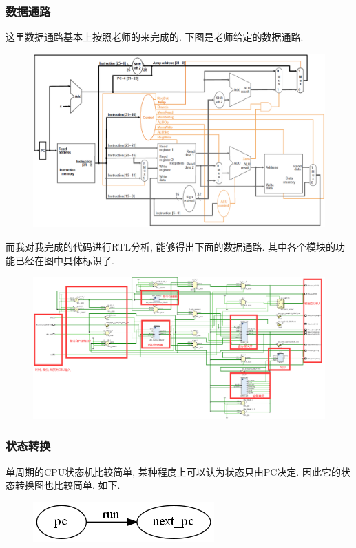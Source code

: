 \documentclass[UTF8]{article}
\begin{document}
\subsubsection{数据通路}
这里数据通路基本上按照老师的来完成的. 下图是老师给定的数据通路.\par
\begin{figure}[H]
	\centering
	\includegraphics[width=\linewidth*2/3]{cpu_data_path_standard.png}
\end{figure}
而我对我完成的代码进行RTL分析, 能够得出下面的数据通路. 其中各个模块的功能已经在图中具体标识了.\par
\begin{figure}[H]
	\centering
	\includegraphics[width=\linewidth]{cpu_data_path_mine.png}
\end{figure}
\subsubsection{状态转换}
单周期的CPU状态机比较简单, 某种程度上可以认为状态只由PC决定. 因此它的状态转换图也比较简单. 如下.\par
\begin{figure}[H]
	\centering
	\includegraphics[width=\linewidth/5]{phase_diagram.png}
\end{figure}
\end{document}
